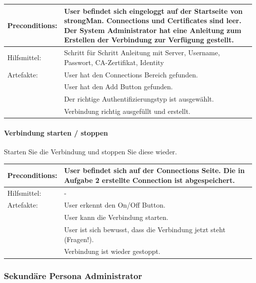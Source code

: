 \begin{tabular}{ | p{} | p{} | }
\hline
Preconditions: & User befindet sich eingeloggt auf der Startseite von strongMan. Connections und Certificates sind leer. Der System Administrator hat eine Anleitung zum Erstellen der Verbindung zur Verfügung gestellt. \\
\hline
Hilfsmittel: & Schritt für Schritt Anleitung mit Server, Username, Passwort, CA-Zertifikat, Identity \\
\hline
Artefakte: & User hat den Connections Bereich gefunden. \\
& User hat den Add Button gefunden. \\
& Der richtige Authentifizierungstyp ist ausgewählt. \\
& Verbindung richtig ausgefüllt und erstellt. \\
\hline
\end{tabular}


\paragraph{Verbindung starten / stoppen}
Starten Sie die Verbindung und stoppen Sie diese wieder. \\


\begin{tabular}{ | p{} | p{} | }
\hline
Preconditions: & User befindet sich auf der Connections Seite. Die in Aufgabe 2 erstellte Connection ist abgespeichert. \\
\hline
Hilfsmittel: & - \\
\hline
Artefakte: & User erkennt den On/Off Button. \\
& User kann die Verbindung starten. \\
& User ist sich bewusst, dass die Verbindung jetzt steht (Fragen!). \\
& Verbindung ist wieder gestoppt. \\
\hline
\end{tabular}

\newpage
\subsubsection{Sekundäre Persona Administrator}

